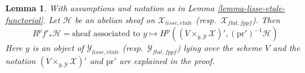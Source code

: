 \documentclass{stacks-project}
\theoremstyle{plain}
\newtheorem{lemma}[subsection]{Lemma}
\theoremstyle{definition}
\theoremstyle{remark}
\numberwithin{equation}{subsection}
\def\etale{{\acute{e}tale}}
\begin{document}
\begin{lemma}
\label{lemma-lisse-etale-functorial-pushforward}
With assumptions and notation as in Lemma \ref{lemma-lisse-etale-functorial}.
Let $\mathcal{H}$  be an abelian sheaf on $\mathcal{X}_{lisse,\etale}$
(resp.\ $\mathcal{X}_{flat,fppf}$). Then
\begin{equation}
\label{equation-higher-direct-image-lisse-etale}
R^pf'_*\mathcal{H} =
\text{sheaf associated to }y \longmapsto
H^p((V \times_{y, \mathcal{Y}} \mathcal{X})', (\text{pr}')^{-1}\mathcal{H})
\end{equation}
Here $y$ is an object of $\mathcal{Y}_{lisse,\etale}$
(resp.\ $\mathcal{Y}_{flat,fppf}$) lying over the scheme $V$
and the notation $(V \times_{y, \mathcal{Y}} \mathcal{X})'$
and $\text{pr}'$ are explained in the proof.
\end{lemma}
\end{document}
